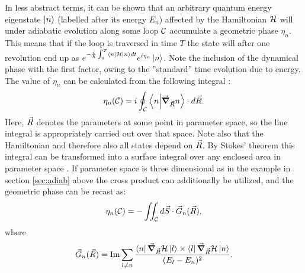 \documentclass[main.tex]{subfiles}
\begin{document}
In less abstract terms, it can be shown that an arbitrary quantum energy eigenstate \(\ket{n}\)
(labelled after its energy \(E_n\)) affected by the Hamiltonian \(\mathbb{\cal H}\) will under adiabatic evolution along some loop
\(\mathbb{\cal C}\) accumulate a geometric phase \(\eta_n\). This means that if the loop is
traversed in time \(T\) the state will after one revolution end up as
\(e^{-\frac{i}{\hbar{}}\int_0^T \bra{n}\mathbb{\cal H}\ket{n} dt} e^{i\eta_n}\ket{n}\). Note
the inclusion of the dynamical phase with the first factor, owing to the ''standard'' time
evolution due to energy. The
value of \(\eta_n\) can be calculated from the following
integral \cite{berry1984}:
\begin{align}\label{eq:etaline}
        \eta_n(\mathbb{\cal C}) = i\oint_{\mathbb{\cal C}}
        \bra{n}\ket{\grad_{\vec{R}}n}\cdot  d \vec{R}
.\end{align}
Here, \(\vec{R}\) denotes the parameters at some point in parameter space, so the line integral is
appropriately carried out over that space. Note also that the Hamiltonian and therefore
also all states depend on \(\vec{R}\). By Stokes' theorem this integral can be
transformed into a surface integral over any enclosed area in parameter space
\cite{berry1984}. If parameter
space is three dimensional as in the example in section \ref{sec:adiab} above the cross product can additionally be
utilized, and the geometric phase can be recast as:
\begin{align}\label{eq:etasurf}
        \eta_n(\mathbb{\cal C}) = -\iint_{\mathbb{\cal
        C}}d \vec{S} \cdot \vec{G}_n(\vec{R})
,\end{align}
where
\begin{align}\label{eq:synmag}
        \vec{G}_n(\vec{R}) = \Im \sum_{l \ne n}
        \frac{\bra{n}\grad_{\vec{R}}\mathbb{\cal H}\ket{l}\times
                \bra{l}\grad_{\vec{R}}\mathbb{\cal H}\ket{n}}{(E_l -
                        E_n)^{2}}
.\end{align}
\end{document}
